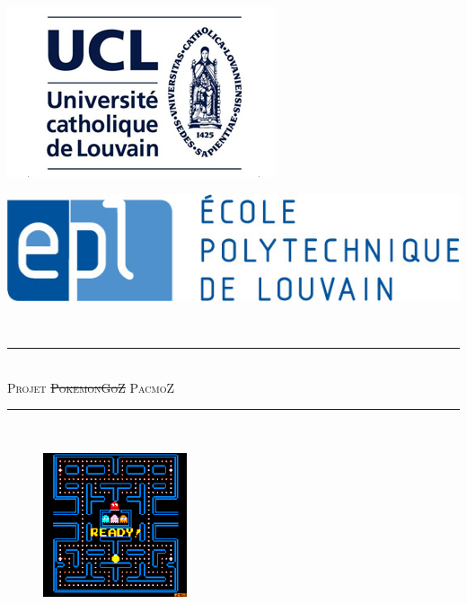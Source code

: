 \begin{titlepage}

\newcommand{\HRule}{\rule{\linewidth}{0.5mm}} %

\center %

\begin{minipage}{0.2\textwidth}
\begin{flushleft} \large
\includegraphics[scale=0.3]{logo-ucl.png}
\end{flushleft}
\end{minipage}
\begin{minipage}{0.79\textwidth}
\begin{flushright} \large
\includegraphics[scale=0.3]{epl-logo.jpg}
\end{flushright}
\end{minipage}\\[0.2cm]



\HRule \\[0.4cm]
{ \huge \textsc{Projet \sout{PokemonGoZ} PacmoZ}}\\[0.15cm] %




\HRule \\[0.4cm]
\centering
\begin{figure}[H]
    \centering
    \includegraphics[scale = 2]{image.png}   
   \label{fig:my_label}
\end{figure}



\end{titlepage}
